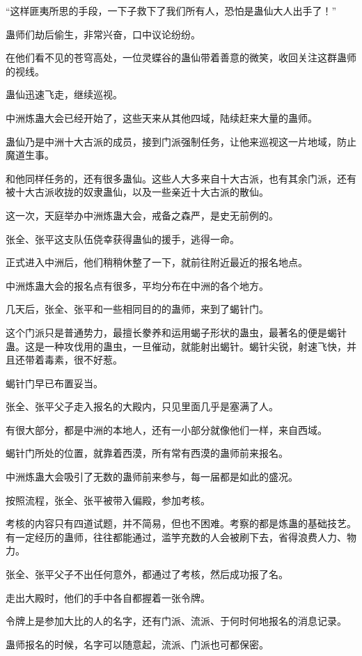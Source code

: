 \begin{this_body}
“这样匪夷所思的手段，一下子救下了我们所有人，恐怕是蛊仙大人出手了！”

蛊师们劫后偷生，非常兴奋，口中议论纷纷。

在他们看不见的苍穹高处，一位灵蝶谷的蛊仙带着善意的微笑，收回关注这群蛊师的视线。

蛊仙迅速飞走，继续巡视。

中洲炼蛊大会已经开始了，这些天来从其他四域，陆续赶来大量的蛊师。

蛊仙乃是中洲十大古派的成员，接到门派强制任务，让他来巡视这一片地域，防止魔道生事。

和他同样任务的，还有很多蛊仙。这些人大多来自十大古派，也有其余门派，还有被十大古派收拢的奴隶蛊仙，以及一些亲近十大古派的散仙。

这一次，天庭举办中洲炼蛊大会，戒备之森严，是史无前例的。

张全、张平这支队伍侥幸获得蛊仙的援手，逃得一命。

正式进入中洲后，他们稍稍休整了一下，就前往附近最近的报名地点。

中洲炼蛊大会的报名点有很多，平均分布在中洲的各个地方。

几天后，张全、张平和一些相同目的的蛊师，来到了蝎针门。

这个门派只是普通势力，最擅长豢养和运用蝎子形状的蛊虫，最著名的便是蝎针蛊。这是一种攻伐用的蛊虫，一旦催动，就能射出蝎针。蝎针尖锐，射速飞快，并且还带着毒素，很不好惹。

蝎针门早已布置妥当。

张全、张平父子走入报名的大殿内，只见里面几乎是塞满了人。

有很大部分，都是中洲的本地人，还有一小部分就像他们一样，来自西域。

蝎针门所处的位置，就靠着西漠，所有常有西漠的蛊师前来报名。

中洲炼蛊大会吸引了无数的蛊师前来参与，每一届都是如此的盛况。

按照流程，张全、张平被带入偏殿，参加考核。

考核的内容只有四道试题，并不简易，但也不困难。考察的都是炼蛊的基础技艺。有一定经历的蛊师，往往都能通过，滥竽充数的人会被刷下去，省得浪费人力、物力。

张全、张平父子不出任何意外，都通过了考核，然后成功报了名。

走出大殿时，他们的手中各自都握着一张令牌。

令牌上是参加大比的人的名字，还有门派、流派、于何时何地报名的消息记录。

蛊师报名的时候，名字可以随意起，流派、门派也可都保密。


\end{this_body}
